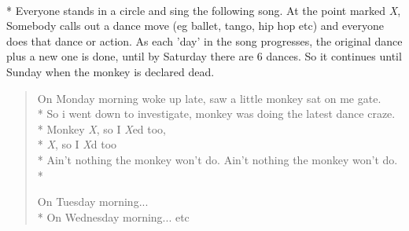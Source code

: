 \begin{minipage}{\textwidth}
\\*
Everyone stands in a circle and sing the following song. At the point marked \textit{X}, Somebody calls out a dance move (eg ballet, tango, hip hop etc) and
 everyone does that dance or action. As each 'day' in the song progresses, the original dance plus a new one is done, until by Saturday there are 6 dances. So it continues until Sunday when the monkey is declared dead.

\begin{quote}
On Monday morning woke up late, saw a little monkey sat on me gate.\\*
So i went down to investigate, monkey was doing the latest dance craze.\\*
Monkey \textit{X}, so I \textit{X}ed too,\\*
\textit{X}, so I \textit{X}d too\\*
Ain't nothing the monkey won't do. Ain't nothing the monkey won't do.\\*

On Tuesday morning...\\*
On Wednesday morning... etc
\end{quote}


\end{minipage}    \vfill
